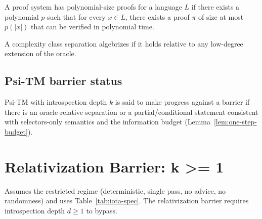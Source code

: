 \begin{definition}
A proof system has polynomial-size proofs for a language $L$ if there exists a polynomial $p$ such that for every $x \in L$, there exists a proof $\pi$ of size at most $p(|x|)$ that can be verified in polynomial time\citep{CookReckhow1979}.
\end{definition}

\begin{definition}
A complexity class separation algebrizes if it holds relative to any low-degree extension of the oracle\citep{AaronsonWigderson2008}.
\end{definition}

\subsection{Psi-TM barrier status}

\begin{definition}
Psi-TM with introspection depth $k$ is said to make progress against a barrier if there is an oracle-relative separation or a partial/conditional statement consistent with selectors-only semantics and the information budget (Lemma~\ref{lem:one-step-budget}).
\end{definition}

\section{Relativization Barrier: k >= 1}

\begin{theorem}
Assumes the restricted regime (deterministic, single pass, no advice, no randomness) and uses Table~\ref{tab:iota-spec}.
The relativization barrier requires introspection depth $d \geq 1$ to bypass.
\end{theorem}

